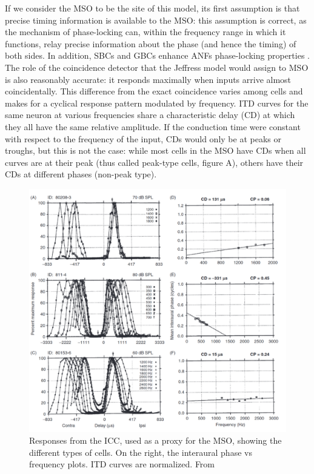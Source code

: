 \documentclass[11pt,a4paper]{article}
\begin{document}
If we consider the MSO to be the site of this model, its first assumption is that precise timing information is available to the MSO: this assumption is correct, as the mechanism of phase-locking can, within the frequency range in which it functions, relay precise information about the phase (and hence the timing) of both sides. In addition, SBCs and GBCs enhance ANFs phase-locking properties \cite{jorisEnhancementNeuralSynchronization1994a}. The role of the coincidence detector that the Jeffress model would assign to MSO is also reasonably accurate: it responds maximally when inputs arrive almost coincidentally. This difference from the exact coincidence varies among cells and makes for a cyclical response pattern modulated by frequency. ITD curves for the same neuron at various frequencies share a characteristic delay (CD) at which they all have the same relative amplitude. If the conduction time were constant with respect to the frequency of the input, CDs would only be at peaks or troughs, but this is not the case: while most cells in the MSO have CDs when all curves are at their peak (thus called peak-type cells, figure A), others have their CDs at different phases (non-peak type).
\begin{figure}[H]
    \centering
    \includegraphics[width=0.5\linewidth]{Images/yin-1530.png}
    \caption{Responses from the ICC, used as a proxy for the MSO, showing the different types of cells. On the right, the interaural phase vs frequency plots. ITD curves are normalized. From \cite{yinNeuralMechanismsBinaural2019}}
\end{figure}
\end{document}
